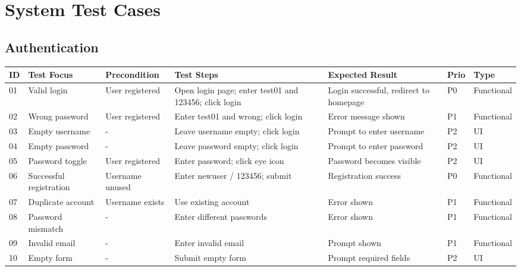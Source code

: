 \begin{appendices}
{\begin{longtable}{|p{1.2cm}|p{3.0cm}|p{3.0cm}|p{3.2cm}|p{2.2cm}|p{1.1cm}|}
\end{longtable}
}


\section{System Test Cases}
\label{appendix:system_testing}


\begin{landscape}
\subsection*{Authentication}

\begin{longtable}{|p{0.6cm}|p{2.8cm}|p{2.5cm}|p{6cm}|p{5cm}|p{1.2cm}|p{1.8cm}|}
\hline
\textbf{ID} & \textbf{Test Focus} & \textbf{Precondition} & \textbf{Test Steps} & \textbf{Expected Result} & \textbf{Prio} & \textbf{Type} \\
\hline

01 & Valid login & User registered & Open login page; enter test01 and 123456; click login & Login successful, redirect to homepage & P0 & Functional \\
\hline
02 & Wrong password & User registered & Enter test01 and wrong; click login & Error message shown & P1 & Functional \\
\hline
03 & Empty username & - & Leave username empty; click login & Prompt to enter username & P2 & UI \\
\hline
04 & Empty password & - & Leave password empty; click login & Prompt to enter password & P2 & UI \\
\hline
05 & Password toggle & User registered & Enter password; click eye icon & Password becomes visible & P2 & UI \\
\hline
06 & Successful registration & Username unused & Enter newuser / 123456; submit & Registration success & P0 & Functional \\
\hline
07 & Duplicate account & Username exists & Use existing account & Error shown & P1 & Functional \\
\hline
08 & Password mismatch & - & Enter different passwords & Error shown & P1 & Functional \\
\hline
09 & Invalid email & - & Enter invalid email & Prompt shown & P1 & Functional \\
\hline
10 & Empty form & - & Submit empty form & Prompt required fields & P2 & UI \\
\hline

\end{longtable}
\end{landscape}



\end{appendices}
